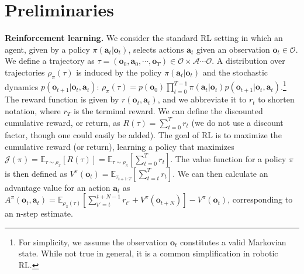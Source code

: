 \documentclass[conference]{IEEEtran}
\newcommand{\ba}{\mathbf{a}}
\newcommand{\bo}{\mathbf{o}}
\begin{document}
\section{Preliminaries}
\label{sect:prelim}

\noindent \textbf{Reinforcement learning.} We consider the standard RL setting in which an agent, given by a policy $\pi(\ba_t | \bo_t)$, selects actions $\ba_t$ given an observation $\bo_t \in \mathcal{O}$. 
We define a trajectory as \mbox{$\tau = (\bo_0, \ba_0, \cdots, \bo_T) \in \mathcal{O} \times \mathcal{A} \cdots \mathcal{O}$}. A distribution over trajectories $\rho_\pi(\tau)$ is induced by the policy $\pi(\ba_t | \bo_t)$ and the stochastic dynamics $p(\bo_{t+1} | \bo_t, \ba_t)$: \mbox{$\rho_{\pi}(\tau) = p(\bo_0) \prod_{t=0}^{T-1} \pi(\ba_t | \bo_t) p(\bo_{t+1} | \bo_t, \ba_t)$}.\footnote{For simplicity, we assume the observation $\bo_t$ constitutes a valid Markovian state. While not true in general, it is a common simplification in robotic RL.} The reward function is given by $r(\bo_t, \ba_t)$, and we abbreviate it to $r_t$ to shorten notation, where $r_T$ is the terminal reward. We can define the discounted cumulative reward, or return, as $R(\tau) = \sum_{t=0}^T r_t$ (we do not use a discount factor, though one could easily be added). The goal of RL is to maximize the cumulative reward (or return), learning a policy that maximizes $\mathcal{J}(\pi) = \mathbb{E}_{\tau \sim \rho_{\pi}}[R(\tau)] = \mathbb{E}_{\tau \sim \rho_{\pi}}[\sum_{t=0}^T r_t]$. The value function for a policy $\pi$ is then defined as $V^\pi(\bo_t) = \mathbb{E}_{\tau_{t+1:T}} [\sum_{t=t}^T r_t]$. We can then calculate an advantage value for an action $\ba_t$ as $A^\pi(\bo_t,\ba_t) = \mathbb{E}_{\rho_{\pi}(\tau)} [\sum_{t'=t}^{t+N-1} r_{t'} + V^\pi(\bo_{t+N})] - V^\pi(\bo_t)$, corresponding to an n-step estimate.
\end{document}

